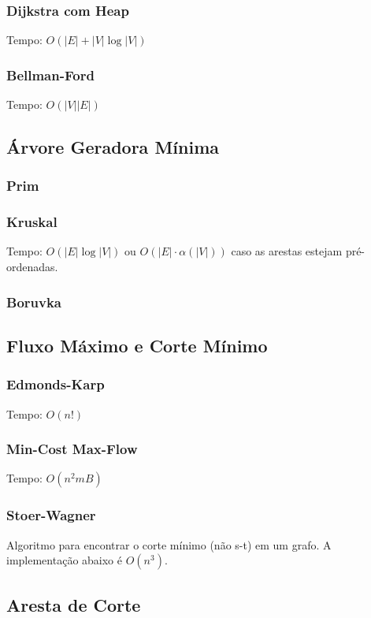 \documentclass[12pt,a4paper]{article}
\begin{document}
			\subsubsection{Dijkstra com Heap}
				Tempo: \( O(|E| + |V| \log |V|) \)
			\subsubsection{Bellman-Ford}
				Tempo: \( O(|V| |E|) \)
				
		\subsection{Árvore Geradora Mínima}
			\subsubsection{Prim}
			\subsubsection{Kruskal}
				Tempo: \( O(|E| \log |V|) \) ou \( O(|E| \cdot \alpha(|V|)) \) caso as arestas estejam pré-ordenadas.
				
			\subsubsection{Boruvka}
		\subsection{Fluxo Máximo e Corte Mínimo}
			\subsubsection{Edmonds-Karp}
				Tempo: \( O(n!) \) %
				
			\subsubsection{Min-Cost Max-Flow}
				Tempo: \( O(n^2 m B) \)
				
			\subsubsection{Stoer-Wagner}
				Algoritmo para encontrar o corte mínimo (não s-t) em um grafo. A implementação abaixo é \(O(n^3)\).
				
		\subsection{Aresta de Corte}
			
\end{document}
